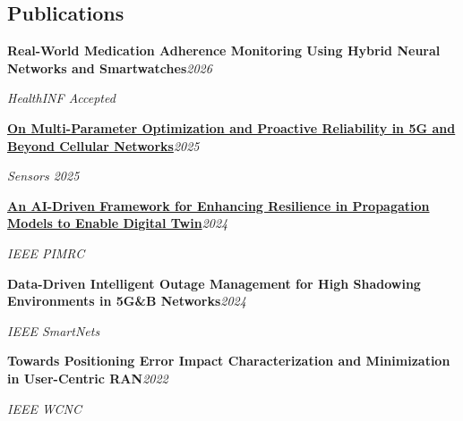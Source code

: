 \documentclass[9pt,letterpaper]{extarticle}
\newcommand{\entry}[2]{\Needspace{4\baselineskip}\textbf{#1}\hfill\textit{#2}\par}
\begin{document}
\subsection{Publications}
\entry{Real-World Medication Adherence Monitoring Using Hybrid Neural Networks and Smartwatches}{2026}
\textit{HealthINF \textbar{} Accepted}\par
\entry{\href{https://doi.org/10.3390/s25247651}{On Multi-Parameter Optimization and Proactive Reliability in 5G and Beyond Cellular Networks}}{2025}
\textit{Sensors 2025}\par
\entry{\href{https://doi.org/10.1109/PIMRC59610.2024.10817403}{An AI-Driven Framework for Enhancing Resilience in Propagation Models to Enable Digital Twin}}{2024}
\textit{IEEE PIMRC}\par
\entry{Data-Driven Intelligent Outage Management for High Shadowing Environments in 5G\&B Networks}{2024}
\textit{IEEE SmartNets}\par
\entry{Towards Positioning Error Impact Characterization and Minimization in User-Centric RAN}{2022}
\textit{IEEE WCNC}\par
{}
\end{document}
